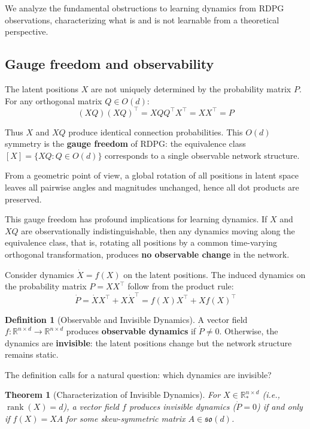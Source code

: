 \documentclass{article}
\newcommand{\RR}{\mathbb{R}}
\newcommand{\so}{\mathfrak{so}}
\DeclareMathOperator{\rank}{rank}
\theoremstyle{plain}
\newtheorem{theorem}{Theorem}
\theoremstyle{definition}
\newtheorem{definition}{Definition}
\theoremstyle{remark}
\begin{document}
We analyze the fundamental obstructions to learning dynamics from RDPG observations, characterizing what is and is not learnable from a theoretical perspective.

\subsection{Gauge freedom and observability}\label{sec:gauge-freedom}

The latent positions $X$ are not uniquely determined by the probability matrix $P$.
For any orthogonal matrix $Q \in O(d)$:
\begin{equation}
(XQ)(XQ)^\top = XQQ^\top X^\top = XX^\top = P
\end{equation}

Thus $X$ and $XQ$ produce identical connection probabilities.
This $O(d)$ symmetry is the \textbf{gauge freedom} of RDPG: the equivalence class $[X] = \{XQ : Q \in O(d)\}$ corresponds to a single observable network structure.

From a geometric point of view, a global rotation of all positions in latent space leaves all pairwise angles and magnitudes unchanged, hence all dot products are preserved.

This gauge freedom has profound implications for learning dynamics.
If $X$ and $XQ$ are observationally indistinguishable, then any dynamics moving along the equivalence class, that is, rotating all positions by a common time-varying orthogonal transformation, produces \textbf{no observable change} in the network.

Consider dynamics $\dot{X} = f(X)$ on the latent positions.
The induced dynamics on the probability matrix $P = XX^\top$ follow from the product rule:
\begin{equation}
\dot{P} = \dot{X} X^\top + X \dot{X}^\top = f(X) X^\top + X f(X)^\top
\end{equation}

\begin{definition}[Observable and Invisible Dynamics]
A vector field $f: \RR^{n \times d} \to \RR^{n \times d}$ produces \textbf{observable dynamics} if $\dot{P} \neq 0$.
Otherwise, the dynamics are \textbf{invisible}: the latent positions change but the network structure remains static.
\end{definition}

The definition calls for a natural question: which dynamics are invisible?

\begin{theorem}[Characterization of Invisible Dynamics]\label{thm:invisible}
For $X \in \RR_*^{n \times d}$ (i.e., $\rank(X) = d$), a vector field $f$ produces invisible dynamics ($\dot{P} = 0$) if and only if $f(X) = XA$ for some skew-symmetric matrix $A \in \so(d)$.
\end{theorem}
\end{document}
